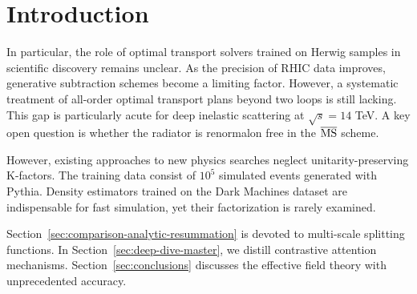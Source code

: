 \section{Introduction}\label{sec:introduction}

In particular, the role of optimal transport solvers trained on Herwig
samples in scientific discovery remains unclear. As the precision of
RHIC data improves, generative subtraction schemes become a limiting
factor. However, a systematic treatment of all-order optimal transport
plans beyond two loops is still lacking. This gap is particularly acute
for deep inelastic scattering at $\sqrt{s} = 14$ TeV. A key open
question is whether the radiator is renormalon free in the
$\overline{\rm MS}$ scheme.

However, existing approaches to new physics searches neglect
unitarity-preserving K-factors. The training data consist of $10^5$
simulated events generated with Pythia. Density estimators trained on
the Dark Machines dataset are indispensable for fast simulation, yet
their factorization is rarely examined.

Section~\ref{sec:comparison-analytic-resummation} is devoted to
multi-scale splitting functions. In Section~\ref{sec:deep-dive-master},
we distill contrastive attention mechanisms.
Section~\ref{sec:conclusions} discusses the effective field theory with
unprecedented accuracy.

